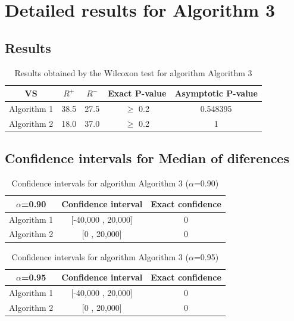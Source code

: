 \documentclass[a4paper,10pt]{article}
\begin{document}
 \clearpage 


\section{Detailed results for Algorithm 3}


\subsection{Results}

\begin{table}[!htp]
\centering\small
\begin{tabular}{
|c|c|c|c|c|}
\hline
 VS & $R^{+}$ & $R^{-}$ & Exact P-value & Asymptotic P-value \\ \hline 
Algorithm 1 & 38.5 & 27.5 & $\geq$ 0.2 & 0.548395\\ \hline 
Algorithm 2 & 18.0 & 37.0 & $\geq$ 0.2 & 1\\ \hline 

\end{tabular}
\caption{Results obtained by the Wilcoxon test for algorithm Algorithm 3}
\end{table}

\subsection{Confidence intervals for Median of diferences}

\begin{table}[!htp]
\centering\small
\begin{tabular}{
|c|c|c|}
\hline
 $\alpha$=0.90 & Confidence interval & Exact confidence \\ \hline 
Algorithm 1 & [-40,000 , 20,000] & 0\\ \hline 
Algorithm 2 & [0 , 20,000] & 0\\ \hline 

\end{tabular}
\caption{Confidence intervals for algorithm Algorithm 3 ($\alpha$=0.90)}
\end{table}
\begin{table}[!htp]
\centering\small
\begin{tabular}{
|c|c|c|}
\hline
 $\alpha$=0.95 & Confidence interval & Exact confidence \\ \hline 
Algorithm 1 & [-40,000 , 20,000] & 0\\ \hline 
Algorithm 2 & [0 , 20,000] & 0\\ \hline 

\end{tabular}
\caption{Confidence intervals for algorithm Algorithm 3 ($\alpha$=0.95)}
\end{table}

 \clearpage 
\end{document}
